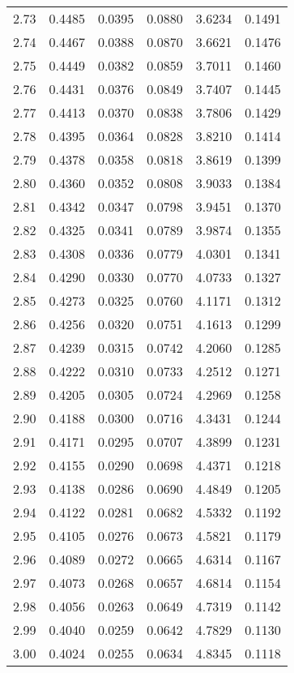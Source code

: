 \documentclass{article}
\begin{document}
\begin{longtable}{cccccc}
2.73 & 0.4485 & 0.0395 & 0.0880 & 3.6234 & 0.1491 \\
2.74 & 0.4467 & 0.0388 & 0.0870 & 3.6621 & 0.1476 \\
2.75 & 0.4449 & 0.0382 & 0.0859 & 3.7011 & 0.1460 \\
2.76 & 0.4431 & 0.0376 & 0.0849 & 3.7407 & 0.1445 \\
2.77 & 0.4413 & 0.0370 & 0.0838 & 3.7806 & 0.1429 \\
2.78 & 0.4395 & 0.0364 & 0.0828 & 3.8210 & 0.1414 \\
2.79 & 0.4378 & 0.0358 & 0.0818 & 3.8619 & 0.1399 \\
2.80 & 0.4360 & 0.0352 & 0.0808 & 3.9033 & 0.1384 \\
2.81 & 0.4342 & 0.0347 & 0.0798 & 3.9451 & 0.1370 \\
2.82 & 0.4325 & 0.0341 & 0.0789 & 3.9874 & 0.1355 \\
2.83 & 0.4308 & 0.0336 & 0.0779 & 4.0301 & 0.1341 \\
2.84 & 0.4290 & 0.0330 & 0.0770 & 4.0733 & 0.1327 \\
2.85 & 0.4273 & 0.0325 & 0.0760 & 4.1171 & 0.1312 \\
2.86 & 0.4256 & 0.0320 & 0.0751 & 4.1613 & 0.1299 \\
2.87 & 0.4239 & 0.0315 & 0.0742 & 4.2060 & 0.1285 \\
2.88 & 0.4222 & 0.0310 & 0.0733 & 4.2512 & 0.1271 \\
2.89 & 0.4205 & 0.0305 & 0.0724 & 4.2969 & 0.1258 \\
2.90 & 0.4188 & 0.0300 & 0.0716 & 4.3431 & 0.1244 \\
2.91 & 0.4171 & 0.0295 & 0.0707 & 4.3899 & 0.1231 \\
2.92 & 0.4155 & 0.0290 & 0.0698 & 4.4371 & 0.1218 \\
2.93 & 0.4138 & 0.0286 & 0.0690 & 4.4849 & 0.1205 \\
2.94 & 0.4122 & 0.0281 & 0.0682 & 4.5332 & 0.1192 \\
2.95 & 0.4105 & 0.0276 & 0.0673 & 4.5821 & 0.1179 \\
2.96 & 0.4089 & 0.0272 & 0.0665 & 4.6314 & 0.1167 \\
2.97 & 0.4073 & 0.0268 & 0.0657 & 4.6814 & 0.1154 \\
2.98 & 0.4056 & 0.0263 & 0.0649 & 4.7319 & 0.1142 \\
2.99 & 0.4040 & 0.0259 & 0.0642 & 4.7829 & 0.1130 \\
3.00 & 0.4024 & 0.0255 & 0.0634 & 4.8345 & 0.1118 \\

\end{longtable}
\end{document}
